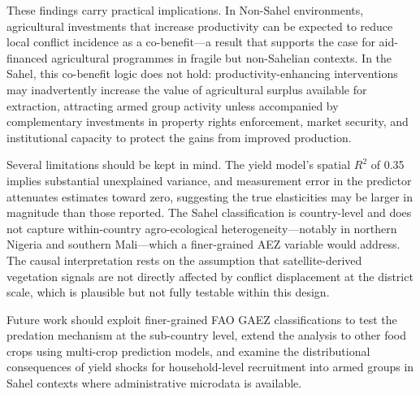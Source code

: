 These findings carry practical implications. In Non-Sahel environments, agricultural investments that increase productivity can be expected to reduce local conflict incidence as a co-benefit---a result that supports the case for aid-financed agricultural programmes in fragile but non-Sahelian contexts. In the Sahel, this co-benefit logic does not hold: productivity-enhancing interventions may inadvertently increase the value of agricultural surplus available for extraction, attracting armed group activity unless accompanied by complementary investments in property rights enforcement, market security, and institutional capacity to protect the gains from improved production.

Several limitations should be kept in mind. The yield model's spatial $R^2$ of 0.35 implies substantial unexplained variance, and measurement error in the predictor attenuates estimates toward zero, suggesting the true elasticities may be larger in magnitude than those reported. The Sahel classification is country-level and does not capture within-country agro-ecological heterogeneity---notably in northern Nigeria and southern Mali---which a finer-grained AEZ variable would address. The causal interpretation rests on the assumption that satellite-derived vegetation signals are not directly affected by conflict displacement at the district scale, which is plausible but not fully testable within this design.

Future work should exploit finer-grained FAO GAEZ classifications to test the predation mechanism at the sub-country level, extend the analysis to other food crops using multi-crop prediction models, and examine the distributional consequences of yield shocks for household-level recruitment into armed groups in Sahel contexts where administrative microdata is available.
